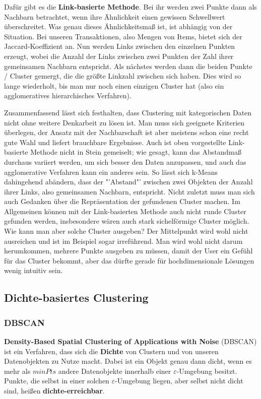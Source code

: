 Dafür gibt es die \textbf{Link-basierte Methode}. Bei ihr werden zwei
Punkte dann als Nachbarn betrachtet, wenn ihre Ähnlichkeit einen
gewissen Schwellwert überschreitet. Was genau dieses Ähnlichkeitsmaß ist,
ist abhängig von der Situation. Bei unseren Transaktionen, also Mengen von
Items, bietet sich der Jaccard-Koeffizient an. Nun werden Links zwischen den
einzelnen Punkten erzeugt, wobei die Anzahl der Links zwischen zwei Punkten
der Zahl ihrer gemeinsamen Nachbarn entspricht. Als nächstes werden dann
die beiden Punkte / Cluster gemergt, die die größte Linkzahl zwischen sich 
haben. Dies wird so lange wiederholt, bis man nur noch einen einzigen Cluster
hat (also ein agglomeratives hierarchisches Verfahren).

Zusammenfassend lässt sich festhalten, dass Clustering mit kategorischen
Daten nicht ohne weitere Denkarbeit zu lösen ist. Man muss sich geeignete
Kriterien überlegen, der Ansatz mit der Nachbarschaft ist aber meistens
schon eine recht gute Wahl und liefert brauchbare Ergebnisse. Auch ist
oben vorgestellte Link-basierte Methode nicht in Stein gemeiselt; wie gesagt,
kann das Abstandmaß durchaus variiert werden, um sich besser den Daten
anzupassen, und auch das agglomerative Verfahren kann ein anderes sein.
So lässt sich k-Means dahingehend abändern, dass der "'Abstand"' zwischen
zwei Objekten der Anzahl ihrer Links, also gemeinsamen Nachbarn, entspricht.
Nicht zuletzt muss man sich auch Gedanken über die Repräsentation der
gefundenen Cluster machen. Im Allgemeinen können mit der Link-basierten
Methode auch nicht runde Cluster gefunden werden, insbesondere wären auch
stark sichelförmige Cluster möglich. Wie kann man aber solche Cluster ausgeben?
Der Mittelpunkt wird wohl nicht ausreichen und ist im Beispiel sogar irreführend.
Man wird wohl nicht darum herumkommen, mehrere Punkte ausgeben zu
müssen, damit der User ein Gefühl für das Cluster bekommt, aber das
dürfte gerade für hochdimensionale Lösungen wenig intuitiv sein.

\subsection{Dichte-basiertes Clustering}
\subsubsection{DBSCAN}
\textbf{Density-Based Spatial Clustering of Applications with Noise} (DBSCAN)
ist ein Verfahren, dass sich die \textbf{Dichte} von Clustern und
von unseren Datenobjekten zu Nutze macht. Dabei ist ein Objekt genau
dann dicht, wenn es mehr als \(minPts\) andere Datenobjekte innerhalb einer
\(\varepsilon\)-Umgebung besitzt. Punkte, die selbst in einer solchen
\(\varepsilon\)-Umgebung liegen, aber selbst nicht dicht sind, heißen
\textbf{dichte-erreichbar}.

